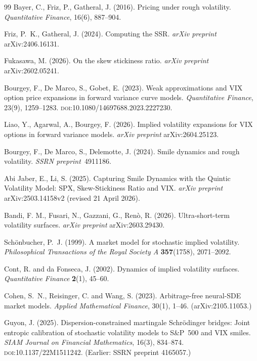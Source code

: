 \documentclass[11pt]{article}
\providecommand{\1}{\mathbf 1}
\begin{document}
{\begin{thebibliography}{99}
Bayer, C., Friz, P., Gatheral, J. (2016). Pricing under rough volatility.
\textit{Quantitative Finance}, 16(6), 887--904.

Friz, P.~K., Gatheral, J. (2024). Computing the SSR. \textit{arXiv preprint} arXiv:2406.16131.

Fukasawa, M. (2026). On the skew stickiness ratio. \textit{arXiv preprint} arXiv:2602.05241.

 Bourgey, F., De Marco, S., Gobet, E. (2023). Weak approximations and VIX
option price expansions in forward variance curve models. \textit{Quantitative Finance}, 23(9),
1259--1283. \textsc{doi}:10.1080/14697688.2023.2227230.

 Liao, Y., Agarwal, A., Bourgey, F. (2026). Implied volatility expansions for
VIX options in forward variance models. \textit{arXiv preprint} arXiv:2604.25123.

Bourgey, F., De Marco, S., Delemotte, J. (2024). Smile dynamics and rough volatility.
\textit{SSRN preprint}~4911186.

Abi Jaber, E., Li, S. (2025).
Capturing Smile Dynamics with the Quintic Volatility Model: SPX, Skew-Stickiness
Ratio and VIX. \textit{arXiv preprint} arXiv:2503.14158v2 (revised 21 April 2026).

 Bandi, F. M., Fusari, N., Gazzani, G., Ren\`o, R. (2026). Ultra-short-term volatility surfaces. \emph{arXiv preprint} arXiv:2603.29430.

Sch\"onbucher, P.~J. (1999).
A market model for stochastic implied volatility.
\emph{Philosophical Transactions of the Royal Society A} \textbf{357}(1758), 2071--2092.

Cont, R. and da Fonseca, J. (2002).
Dynamics of implied volatility surfaces.
\emph{Quantitative Finance} \textbf{2}(1), 45--60.

Cohen, S.~N., Reisinger, C. and Wang, S. (2023).
Arbitrage-free neural-SDE market models.
\emph{Applied Mathematical Finance}, 30(1), 1--46. (arXiv:2105.11053.)

Guyon, J. (2025).
Dispersion-constrained martingale Schr\"odinger bridges: Joint entropic calibration of
stochastic volatility models to S\&P~500 and VIX smiles.
\textit{SIAM Journal on Financial Mathematics}, 16(3), 834--874.
\textsc{doi}:10.1137/22M1511242. (Earlier: SSRN preprint 4165057.)


\end{thebibliography}}
\end{document}
